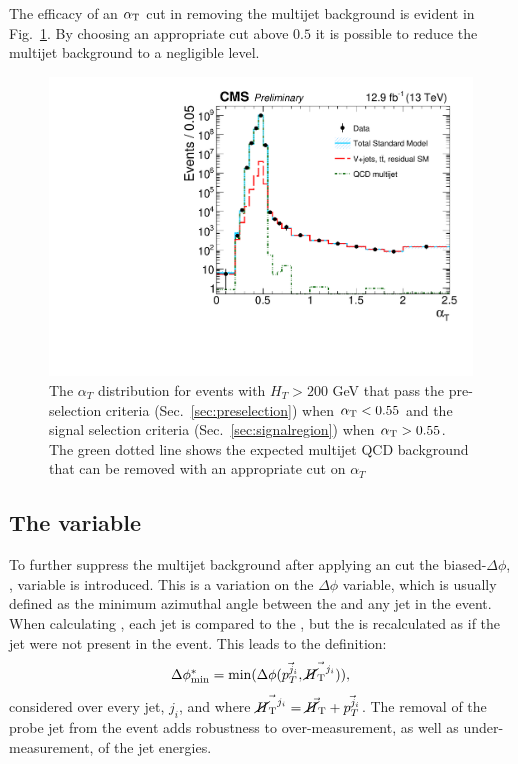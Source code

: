 The efficacy of an $\alpha_{\text{T}}$ cut in removing the \QCD multijet
background is evident in Fig.~\ref{fig:alphaT}. By
choosing an appropriate cut above $0.5$ it is possible to reduce the
multijet background to a negligible level.

\begin{figure}
	\begin{center}
		\includegraphics[width=0.7\linewidth]{figs/analysis/eventSelection/CMS-PAS-SUS-16-016_Figure-aux_001}%
	\end{center}
  \caption{The $\alpha_T$ distribution for events with $H_T>200$ GeV
  that pass the pre-selection criteria (Sec.~\ref{sec:preselection}) when
  $\alpha_{\text{T}}<0.55$ and the signal selection criteria
  (Sec.~\ref{sec:signalregion}) when
  $\alpha_{\text{T}}>0.55$. The green dotted line shows the expected multijet
  QCD background that can be removed with an appropriate cut on
  $\alpha_T$}
	\label{fig:alphaT}
\end{figure}

\subsection{The \bdphi variable}

To further suppress the \QCD multijet background after applying an
\alphat cut the biased-$\Delta\phi$, \bdphi, variable is introduced.
This is a variation on the $\Delta\phi$ variable, which is usually
defined as the minimum azimuthal angle between the \MET and any jet in
the event. When calculating \bdphi, each jet is compared to the
\MHT, but the \MHT is recalculated as if the jet were not present in
the event. This leads to the definition:
\begin{equation}
\mbox{$\Delta\phi^{*}_{\rm min}$} = \mathrm{min}(\Delta\phi(\vec{p_T^{j_i}},\vec{\mbox{$\cancel{H}_\text{T}$}^{j_i}})),
\end{equation}
considered over every jet, $j_i$, and where
$\vec{\mbox{$\cancel{H}_\text{T}$}^{j_i}}=\vec{\mbox{$\cancel{H}_\text{T}$}}+\vec{p_T^{j_i}}$. The removal of the
probe jet from the event adds robustness to over-measurement, as well
as under-measurement, of the jet energies.

